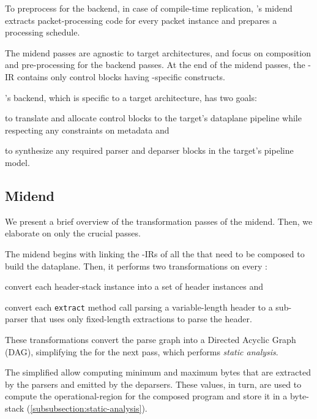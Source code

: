 \documentclass[letterpaper,twocolumn,10pt]{article}
\begin{document}
To preprocess for the backend, in case of compile-time replication,
\ucomp's midend extracts packet-processing code for every packet
instance and prepares a processing schedule.

The midend passes are agnostic to target architectures, and focus on
composition and pre-processing for the backend passes. At the end of
the midend passes, the \ucomp-IR contains only control blocks having
\uarch-specific constructs.

%
\ucomp's backend, which is specific to a target architecture, has two
goals:
\begin{enumerate*}[label=(\roman*)]
  \item to translate and allocate control blocks to the target's
    dataplane pipeline while respecting any constraints on metadata
    and
  \item to synthesize any required parser and deparser blocks in
    the target's pipeline model.
\end{enumerate*}



\subsection{\ucomp Midend}
\label{sec:compiler-midend}
We present a brief overview of the transformation passes of the
midend. Then, we elaborate on only the crucial passes.

The midend begins with linking the \ucomp-IRs of all the \uprograms
that need to be composed to build the dataplane. Then, it performs
two transformations on every \uprogram:
\begin{enumerate*}[label=(\roman*)]
  \item convert each header-stack instance into a set of header
    instances and
  \item convert each \texttt{extract} method call parsing a
    variable-length header to a sub-parser that uses only fixed-length
    extractions to parse the header.
\end{enumerate*}
These transformations convert the parse graph into a Directed Acyclic
Graph (DAG), simplifying the \uprograms for the next pass, which
performs \emph{static analysis}.

 The simplified \uprograms allow computing
minimum and maximum bytes that are extracted by the parsers and
emitted by the deparsers. These values, in turn, are used to compute
the operational-region for the composed program and store it in a
byte-stack (\cref{subsubsection:static-analysis}).
\end{document}
